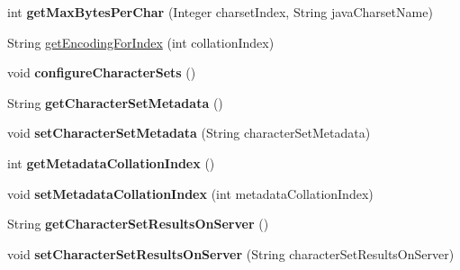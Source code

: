 \begin{DoxyCompactItemize}
int {\bfseries get\+Max\+Bytes\+Per\+Char} (Integer charset\+Index, String java\+Charset\+Name)
\item 
String \mbox{\hyperlink{classcom_1_1mysql_1_1cj_1_1protocol_1_1x_1_1_x_server_session_a3184e5a4acad8af656fb72a6b57a5fa8}{get\+Encoding\+For\+Index}} (int collation\+Index)
\item 
\mbox{\label{classcom_1_1mysql_1_1cj_1_1protocol_1_1x_1_1_x_server_session_a260688fd1a089273e598fb0e95a066b7}} 
void {\bfseries configure\+Character\+Sets} ()
\item 
\mbox{\label{classcom_1_1mysql_1_1cj_1_1protocol_1_1x_1_1_x_server_session_abe3c372a1bd8d70a5229778e8cf17a62}} 
String {\bfseries get\+Character\+Set\+Metadata} ()
\item 
\mbox{\label{classcom_1_1mysql_1_1cj_1_1protocol_1_1x_1_1_x_server_session_a0f5880e0800be3703db6c98bcb5ee7ed}} 
void {\bfseries set\+Character\+Set\+Metadata} (String character\+Set\+Metadata)
\item 
\mbox{\label{classcom_1_1mysql_1_1cj_1_1protocol_1_1x_1_1_x_server_session_a09e1089e8ae704f9d38ee7c87ca18d72}} 
int {\bfseries get\+Metadata\+Collation\+Index} ()
\item 
\mbox{\label{classcom_1_1mysql_1_1cj_1_1protocol_1_1x_1_1_x_server_session_a6f374cd57560302ea8fdeaa141227cae}} 
void {\bfseries set\+Metadata\+Collation\+Index} (int metadata\+Collation\+Index)
\item 
\mbox{\label{classcom_1_1mysql_1_1cj_1_1protocol_1_1x_1_1_x_server_session_aee32f7a4b8a0e1fccc0e7fb8bba92d98}} 
String {\bfseries get\+Character\+Set\+Results\+On\+Server} ()
\item 
\mbox{\label{classcom_1_1mysql_1_1cj_1_1protocol_1_1x_1_1_x_server_session_a53a07197cb0512e9b74ddd1e4478dbb8}} 
void {\bfseries set\+Character\+Set\+Results\+On\+Server} (String character\+Set\+Results\+On\+Server)

\end{DoxyCompactItemize}
